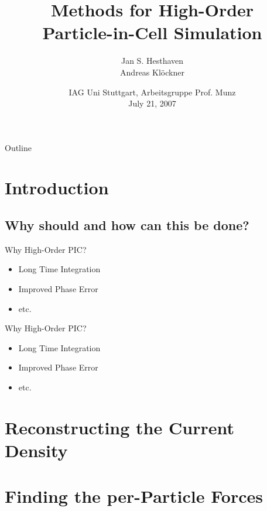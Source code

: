\documentclass{beamer}
\title{Methods for High-Order\\Particle-in-Cell Simulation}
\author[Jan S. Hesthaven and Andreas Kl\"ockner]{Jan S. Hesthaven\\Andreas Kl\"ockner}
\date[IAG Uni Stuttgart]{IAG Uni Stuttgart, Arbeitsgruppe Prof. Munz\\July 21, 2007}
\begin{document}

\frame{\titlepage}

\section[Outline]{}
\begin{frame}{Outline}
  \tableofcontents
\end{frame}

\section{Introduction}
\subsection{Why should and how can this be done?}
\begin{frame}{Why High-Order PIC?}
  \begin{itemize}
    \item Long Time Integration
    \item Improved Phase Error
    \item etc.
  \end{itemize}
  
\end{frame}
\begin{frame}{Why High-Order PIC?}
  \begin{itemize}
    \item Long Time Integration
    \item Improved Phase Error
    \item etc.
  \end{itemize}
  
\end{frame}
\section[Reconstruction]{Reconstructing the Current Density}
\section[Pushing]{Finding the per-Particle Forces}
\end{document}
